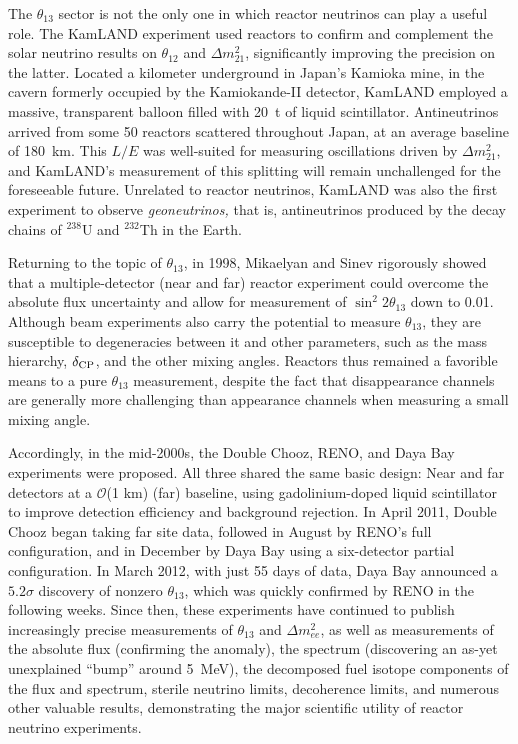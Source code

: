 \documentclass[../thesis.tex]{subfiles}
\begin{document}
The $\theta_{13}$ sector is not the only one in which reactor neutrinos can play
a useful role. The KamLAND experiment used reactors to confirm and complement
the solar neutrino results on $\theta_{12}$ and $\Delta m^2_{21}$, significantly
improving the precision on the latter. Located a kilometer underground in
Japan's Kamioka mine, in the cavern formerly occupied by the Kamiokande-II
detector, KamLAND employed a massive, transparent balloon filled with 20~t of
liquid scintillator. Antineutrinos arrived from some 50 reactors scattered
throughout Japan, at an average baseline of 180~km. This $L/E$ was well-suited
for measuring oscillations driven by $\Delta m^2_{21}$, and KamLAND's
measurement of this splitting will remain unchallenged for the foreseeable
future. Unrelated to reactor neutrinos, KamLAND was also the first experiment to
observe \emph{geoneutrinos,} that is, antineutrinos produced by the decay chains
of $^{238}$U and $^{232}$Th in the Earth.

Returning to the topic of $\theta_{13}$, in 1998, Mikaelyan and Sinev rigorously
showed that a multiple-detector (near and far) reactor experiment could overcome
the absolute flux uncertainty and allow for measurement of $\sin^2 2\theta_{13}$
down to 0.01. Although beam experiments also carry the potential to measure
$\theta_{13}$, they are susceptible to degeneracies between it and other
parameters, such as the mass hierarchy, $\delta_\text{CP}$, and the other mixing
angles. Reactors thus remained a favorible means to a pure $\theta_{13}$
measurement, despite the fact that disappearance channels are generally more
challenging than appearance channels when measuring a small mixing angle.

Accordingly, in the mid-2000s, the Double Chooz, RENO, and Daya Bay experiments
were proposed. All three shared the same basic design: Near and far detectors at
a $\mathcal{O}$(1 km) (far) baseline, using gadolinium-doped liquid scintillator
to improve detection efficiency and background rejection. In April 2011, Double
Chooz began taking far site data, followed in August by RENO's full
configuration, and in December by Daya Bay using a six-detector partial
configuration. In March 2012, with just 55 days of data, Daya Bay announced a
$5.2\sigma$ discovery of nonzero $\theta_{13}$, which was quickly confirmed by
RENO in the following weeks. Since then, these experiments have continued to
publish increasingly precise measurements of $\theta_{13}$ and $\Delta
m^2_{ee}$, as well as measurements of the absolute flux (confirming the
anomaly), the spectrum (discovering an as-yet unexplained ``bump'' around
5~MeV), the decomposed fuel isotope components of the flux and spectrum, sterile
neutrino limits, decoherence limits, and numerous other valuable results,
demonstrating the major scientific utility of reactor neutrino experiments.
\end{document}
